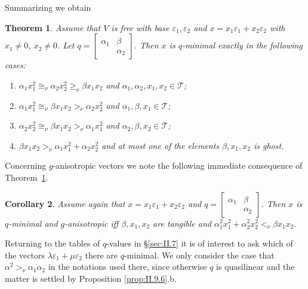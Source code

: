 \documentclass [12pt,a4paper,reqno]{amsart}
\newtheorem{thm}{Theorem} [section]
\newtheorem{cor}[thm]{Corollary}
\begin{document}
Summarizing we obtain
\begin{thm}\label{thm:II.9.7}
Assume that $V$ is free with base ${\varepsilon}_1, {\varepsilon}_2$ and $x = x_1 {\varepsilon}_1 +  x_2 {\varepsilon}_2$ with $x_1 \neq 0$,  $x_2 \neq 0$.
Let  $q = \left[\begin{smallmatrix} {\alpha}_1 & {\beta} \\  &{\alpha}_2\end{smallmatrix}\right]$. Then  $x$ is $q$-minimal exactly in the following cases:

\begin{enumerate} {\setlength{\itemsep}{2pt}}
\item[1)] ${\alpha}_1 x_1^2 {\cong_\nu}  {\alpha}_2 x_2^2 \geq_\nu  {\beta} x_1 x_2$ and  ${\alpha}_1, {\alpha}_2, x_1, x_2 \in {\mathcal T}$;
\item[2)] ${\alpha}_1 x_1^2 {\cong_\nu}  {\beta} x_1 x_2 >_\nu {\alpha}_2 x_2^2   $ and  ${\alpha}_1, {\beta}, x_1 \in {\mathcal T}$;
\item[3)] ${\alpha}_2 x_2^2 {\cong_\nu}  {\beta} x_1 x_2 >_\nu {\alpha}_1 x_1^2   $ and  ${\alpha}_2, {\beta}, x_2 \in {\mathcal T}$;
\item[4)] ${\beta} x_1 x_2 >_\nu {\alpha}_1 x_1^2 +    {\alpha}_2 x_2^2   $ and  at most one of the elements $ {\beta}, x_1, x_2$ is ghost.
\end{enumerate}
\end{thm}

Concerning  $g$-anisotropic vectors we note the following immediate consequence of Theorem~\ref{thm:II.9.7}.
\begin{cor}\label{cor:II.9.8}
Assume again that  $x = x_1 {\varepsilon}_1 +  x_2 {\varepsilon}_2$ and $q = \left[\begin{smallmatrix} {\alpha}_1 & {\beta} \\  &{\alpha}_2\end{smallmatrix}\right]$. Then  $x$ is $q$-minimal and $g$-anisotropic iff ${\beta}, x_1, x_2$ are tangible and
${\alpha}_1^2 x_1^2 + {\alpha}_2^2 x_2^2 < _\nu {\beta} x_1 x_2.$
\end{cor}

Returning to the tables of $q$-values in \S\ref{sec:II.7} it is of interest to ask which of the vectors
${\lambda} {\varepsilon}_1 + \mu {\varepsilon}_2$ there are $q$-minimal. We only consider the case that ${\alpha}^2 > _\nu {\alpha}_1 {\alpha}_2$ in the notations used there, since otherwise $q$ is quasilinear and the matter is settled by Proposition \ref{prop:II.9.6}.b.
\end{document}
